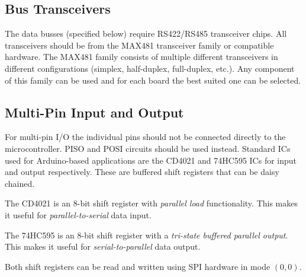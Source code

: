 \documentclass{scrreprt}
\begin{document}
\subsection{Bus Transceivers}
The data busses (specified below) require RS422/RS485 transceiver chips.
All transceivers should be from the MAX481 transceiver family or compatible hardware.
The MAX481 family consists of multiple different transceivers in different configurations (simplex, half-duplex, full-duplex, etc.).
Any component of this family can be used and for each board the best suited one can be selected.

\subsection{Multi-Pin Input and Output}
For multi-pin I/O the individual pins should not be connected directly to the microcontroller.
PISO and POSI circuits should be used instead.
Standard ICs used for Arduino-based applications are the CD4021 and 74HC595 ICs for input and output respectively.
These are buffered shift registers that can be daisy chained.

The CD4021 is an 8-bit shift register with \emph{parallel load} functionality.
This makes it useful for \emph{parallel-to-serial} data input.

The 74HC595 is an 8-bit shift register with a \emph{tri-state buffered parallel output}.
This makes it useful for \emph{serial-to-parallel} data output.

Both shift registers can be read and written using SPI hardware in mode $(0,0)$.
\end{document}
